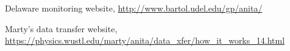 \documentclass{article}
\begin{document}
\begin{thebibliography}{99}
        
 Delaware monitoring website, \url{http://www.bartol.udel.edu/gp/anita/}

  Marty's data transfer website, \url{https://physics.wustl.edu/marty/anita/data_xfer/how_it_works_14.html}

\end{thebibliography}
\end{document}
